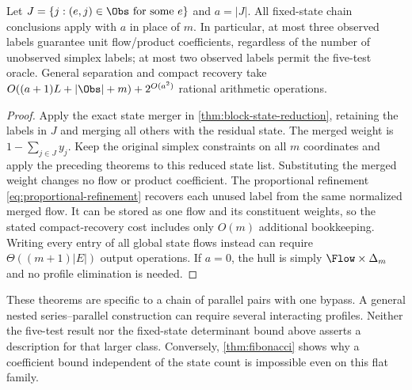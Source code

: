 \begin{corollary}\label{cor:chain-observed-labels}
Let $J=\{j:(e,j)\in\Obs\text{ for some }e\}$ and $a=|J|$.
All fixed-state chain conclusions apply with $a$ in place of $m$.
In particular, at most three observed labels guarantee unit flow/product
coefficients, regardless of the number of unobserved simplex labels;
at most two observed labels permit the five-test oracle.
General separation and compact recovery take
$O((a+1)L+|\Obs|+m)+2^{O(a^2)}$ rational arithmetic operations.
\end{corollary}
\begin{proof}
Apply the exact state merger in \cref{thm:block-state-reduction},
retaining the labels in $J$ and merging all others with the residual
state. The merged weight is $1-\sum_{j\in J}y_j$.
Keep the original simplex constraints on all $m$ coordinates and
apply the preceding theorems to this reduced state list. Substituting
the merged weight changes no flow or product coefficient. The
proportional refinement \eqref{eq:proportional-refinement} recovers
each unused label from the same normalized merged flow. It can be
stored as one flow and its constituent weights, so the stated
compact-recovery cost includes only $O(m)$ additional bookkeeping.
Writing every entry of all global state flows instead can require
$\Theta((m+1)|E|)$ output operations. If $a=0$, the hull is simply
$\Flow\times\Delta_m$ and no profile elimination is needed.
\end{proof}

These theorems are specific to a chain of parallel pairs with one bypass.
A general nested series--parallel construction can require several
interacting profiles. Neither the five-test result nor the
fixed-state determinant bound above asserts a description for that
larger class. Conversely, \cref{thm:fibonacci} shows why a coefficient
bound independent of the state count is impossible even on this
flat family.
